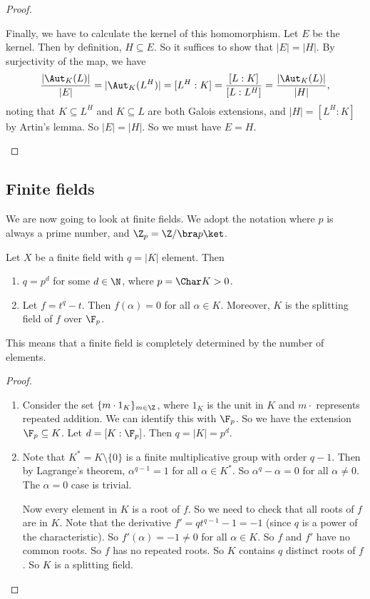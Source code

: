 \documentclass[a4paper]{article}
\begin{document}
\begin{proof}
\begin{enumerate}
      Finally, we have to calculate the kernel of this homomorphism. Let $E$ be the kernel. Then by definition, $H\subseteq E$. So it suffices to show that $|E| = |H|$. By surjectivity of the map, we have
      \[
        \frac{|\Aut_K(L)|}{|E|} = |\Aut_K(L^H)| = [L^H:K] = \frac{[L:K]}{[L:L^H]} = \frac{|\Aut_K(L)|}{|H|},
      \]
      noting that $K\subseteq L^H$ and $K\subseteq L$ are both Galois extensions, and $|H| = [L^H:K]$ by Artin's lemma. So $|E| = |H|$. So we must have $E = H$.
  \end{enumerate}
\end{proof}

\subsection{Finite fields}
We are now going to look at finite fields. We adopt the notation where $p$ is always a prime number, and $\Z_p =\Z/\bra p\ket$.

\begin{lemma}
  Let $X$ be a finite field with $q = |K|$ element. Then
  \begin{enumerate}
    \item $q = p^d$ for some $d \in \N$, where $p = \Char K > 0$.
    \item Let $f = t^q - t$. Then $f(\alpha) = 0$ for all $\alpha \in K$. Moreover, $K$ is the splitting field of $f$ over $\F_p$.
  \end{enumerate}
\end{lemma}
This means that a finite field is completely determined by the number of elements.

\begin{proof}\leavevmode
  \begin{enumerate}
    \item Consider the set $\{m \cdot 1_K\}_{m \in \Z}$, where $1_K$ is the unit in $K$ and $m\cdot$ represents repeated addition. We can identify this with $\F_p$. So we have the extension $\F_p \subseteq K$. Let $d = [K: \F_p]$. Then $q = |K| = p^d$.

    \item Note that $K^* = K\setminus \{0\}$ is a finite multiplicative group with order $q - 1$. Then by Lagrange's theorem, $\alpha^{q - 1} = 1$ for all $\alpha\in K^*$. So $\alpha^q - \alpha = 0$ for all $\alpha \not= 0$. The $\alpha = 0$ case is trivial.

      Now every element in $K$ is a root of $f$. So we need to check that all roots of $f$ are in $K$. Note that the derivative $f' = qt^{q - 1} - 1 = -1$ (since $q$ is a power of the characteristic). So $f'(\alpha) = -1 \not= 0$ for all $\alpha \in K$. So $f$ and $f'$ have no common roots. So $f$ has no repeated roots. So $K$ contains $q$ distinct roots of $f$. So $K$ is a splitting field.
  \end{enumerate}
\end{proof}
\end{document}
